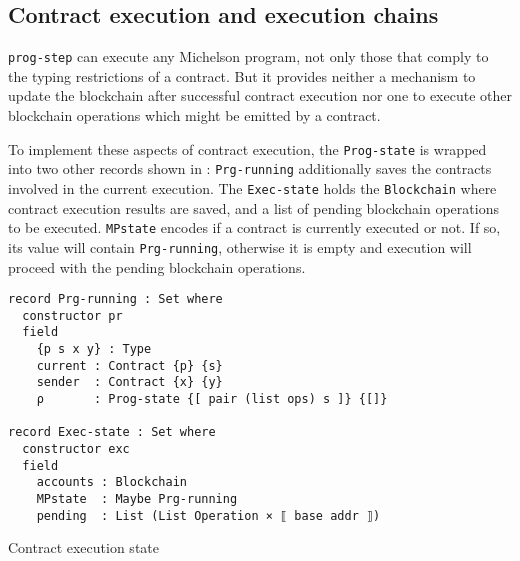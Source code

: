\subsection{Contract execution and execution chains}\label{sec:contract-execution}

\verb/prog-step/ can execute any Michelson program, not only those that comply
to the typing restrictions of a contract.
But it provides neither a mechanism to update the blockchain after successful contract execution
nor one to execute other blockchain operations which might be emitted by a contract.

\begin{comment}
When a contract execution terminates, the final stack interpretation will contain a pair
of a list of blockchain operations to be emitted by the contract as well as the updated
storage value of the contract.
Also contract execution is triggered by transfering some amount of Tezos tokens to it,
so it's balance and storage has to be updated and the emitted operations
must be staged for execution.
\end{comment}

To implement these aspects of contract execution, the \verb=Prog-state= is wrapped
into two other records shown in :
\verb=Prg-running= additionally saves the contracts involved in the current execution.
The \verb=Exec-state= holds the \verb=Blockchain= where contract execution results are saved,
and a list of pending blockchain operations to be executed.
\verb/MPstate/ encodes if a contract is currently executed or not.
If so, its value will contain \verb/Prg-running/, otherwise it is empty and execution
will proceed with the pending blockchain operations.

\begin{listing}[!ht]
\begin{verbatim}
record Prg-running : Set where
  constructor pr
  field
    {p s x y} : Type
    current : Contract {p} {s}
    sender  : Contract {x} {y}
    ρ       : Prog-state {[ pair (list ops) s ]} {[]}

record Exec-state : Set where
  constructor exc
  field
    accounts : Blockchain
    MPstate  : Maybe Prg-running
    pending  : List (List Operation × ⟦ base addr ⟧)
\end{verbatim}
\caption{Contract execution state}
\label{Exec-state}
\end{listing}

